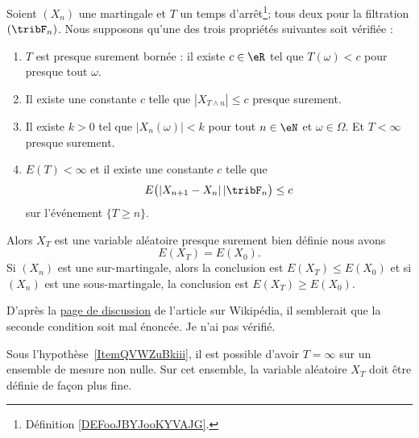 \begin{theorem} \label{ThoZTrdjtZ}
	Soient \( (X_n)\) une martingale et \( T\) un temps d'arrêt\footnote{Définition \ref{DEFooJBYJooKYVAJG}.}; tous deux pour la filtration \( (\tribF_n)\). Nous supposons qu'une des trois propriétés suivantes soit vérifiée :
	\begin{enumerate}
		\item
		      \( T\) est presque surement bornée : il existe \( c\in \eR\) tel que \( T(\omega)<c\) pour presque tout \( \omega\).
		\item   \label{ItemQVWZuBkiii}
		      Il existe une constante \( c\) telle que \( | X_{T\wedge n} |\leq c\) presque surement.
		\item
		      Il existe \( k>0\) tel que \( | X_n(\omega) |<k\) pour tout \( n\in \eN\) et \( \omega\in\Omega\). Et \( T<\infty\) presque surement.
		\item
		      \( E(T)<\infty\) et il existe une constante \( c\) telle que
		      \begin{equation}
			      E\big( | X_{n+1}-X_n |\,|\tribF_n \big)\leq c
		      \end{equation}
		      sur l'événement \( \{ T\geq n \}\).
	\end{enumerate}
	Alors \( X_T\) est une variable aléatoire presque surement bien définie nous avons
	\begin{equation}
		E(X_T)=E(X_0).
	\end{equation}
	Si \( (X_n)\) est une sur-martingale, alors la conclusion est \( E(X_T)\leq E(X_0)\) et si \( (X_n)\) est une sous-martingale, la conclusion est \( E(X_T)\geq E(X_0)\).
\end{theorem}

\begin{probleme}
	D'après la \href{https://en.wikipedia.org/wiki/Talk:Optional_stopping_theorem}{page de discussion} de l'article sur Wikipédia, il semblerait que la seconde condition soit mal énoncée. Je n'ai pas vérifié.
\end{probleme}

\begin{remark}
	Sous l'hypothèse~\ref{ItemQVWZuBkiii}, il est possible d'avoir \( T=\infty\) sur un ensemble de mesure non nulle. Sur cet ensemble, la variable aléatoire \( X_T\) doit être définie de façon plus fine.
\end{remark}

